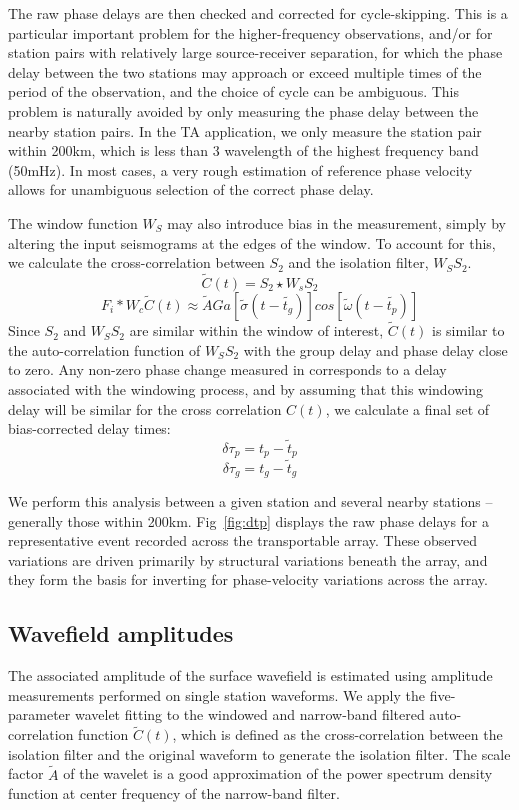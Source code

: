 \documentclass[referee]{gji}
\begin{document}
The raw phase delays are then checked and corrected for cycle-skipping.  This is a particular important problem for the higher-frequency observations, and/or for station pairs with relatively large source-receiver separation, for which the phase delay between the two stations may approach or exceed multiple times of the period of the observation, and the choice of cycle can be ambiguous. This problem is naturally avoided by only measuring the phase delay between the nearby station pairs. In the TA application, we only measure the station pair within 200km, which is less than 3 wavelength of the highest frequency band (50mHz). In most cases, a very rough estimation of reference phase velocity allows for unambiguous selection of the correct phase delay. 

The window function $W_S$ may also introduce bias in the measurement, simply by altering the input seismograms at the edges of the window.  To account for this, we calculate the cross-correlation between $S_2$ and the isolation filter, $W_SS_2$.
\[
\tilde{C}(t) = S_2 \star W_sS_2
\]
\[
F_i \ast W_c \tilde{C}(t) \approx \tilde{A} Ga [\tilde{\sigma}(t-\tilde{t_g})]cos[\tilde{\omega}(t-\tilde{t_p})]
\]
Since $S_2$ and $W_SS_2$ are similar within the window of interest, $\tilde{C}(t)$ is similar to the auto-correlation function of $W_S S_2$ with the group delay and phase delay close to zero. Any non-zero phase change measured in  corresponds to a delay associated with the windowing process, and by assuming that this windowing delay will be similar for the cross correlation $C(t)$, we calculate a final set of bias-corrected delay times:
\[
\delta \tau_p = t_p - \tilde{t}_p 
\]
\[
\delta \tau_g = t_g - \tilde{t}_g
\]

We perform this analysis between a given station and several nearby stations – generally those within 200km.  Fig~\ref{fig:dtp} displays the raw phase delays for a representative event recorded across the transportable array. These observed variations are driven primarily by structural variations beneath the array, and they form the basis for inverting for phase-velocity variations across the array.  

\subsection{Wavefield amplitudes}
\label{sec:amp}
The associated amplitude of the surface wavefield is estimated using amplitude measurements performed on single station waveforms. We apply the five-parameter wavelet fitting to the windowed and narrow-band filtered auto-correlation function $\tilde{C}(t)$, which is defined as the cross-correlation between the isolation filter and the original waveform to generate the isolation filter. The scale factor $\tilde{A}$ of the wavelet is a good approximation of the power spectrum density function at center frequency of the narrow-band filter.
\end{document}
